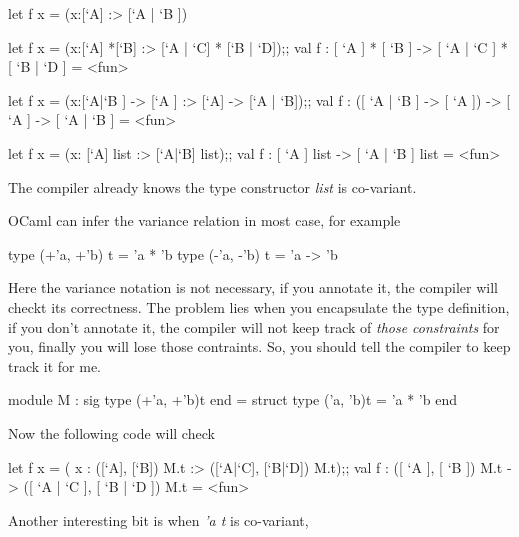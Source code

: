 \begin{ocamlcode}
  let f x = (x:[`A] :> [`A | `B ])
\end{ocamlcode}

\begin{ocamlcode}
  let f x = (x:[`A] *[`B] :> [`A | `C] * [`B | `D]);;
  val f : [ `A ] * [ `B ] -> [ `A | `C ] * [ `B | `D ] = <fun>
\end{ocamlcode}

\begin{ocamlcode}
  let f x = (x:[`A|`B ] -> [`A ] :> [`A] -> [`A | `B]);;
  val f : ([ `A | `B ] -> [ `A ]) -> [ `A ] -> [ `A | `B ] = <fun>
\end{ocamlcode}

\begin{ocamlcode}
  let f x = (x: [`A] list :> [`A|`B] list);;
  val f : [ `A ] list -> [ `A | `B ] list = <fun>
\end{ocamlcode}
The compiler already knows the type constructor \textit{list} is
co-variant.

OCaml can infer the variance relation in most case, for
example

\begin{ocamlcode}
  type (+'a, +'b) t = 'a * 'b
  type (-'a, -'b) t = 'a -> 'b 
\end{ocamlcode}

Here the variance notation is not necessary, if you annotate it, the
compiler will checkt its correctness. The problem lies when you
encapsulate  the type definition, if you don't annotate it, the
compiler will not keep track of \textit{those constraints} for you,
finally you will lose those contraints. So, you should tell the
compiler to keep track it for me.

\begin{ocamlcode}
  module M : sig
    type (+'a, +'b)t 
    end = struct
    type ('a, 'b)t = 'a * 'b
  end
\end{ocamlcode}

Now the following code will check

\begin{ocamlcode}
let f x = ( x : ([`A], [`B]) M.t :> ([`A|`C], [`B|`D]) M.t);;
val f : ([ `A ], [ `B ]) M.t -> ([ `A | `C ], [ `B | `D ]) M.t = <fun>  
\end{ocamlcode}

Another interesting bit is when \textit{'a t} is co-variant,


